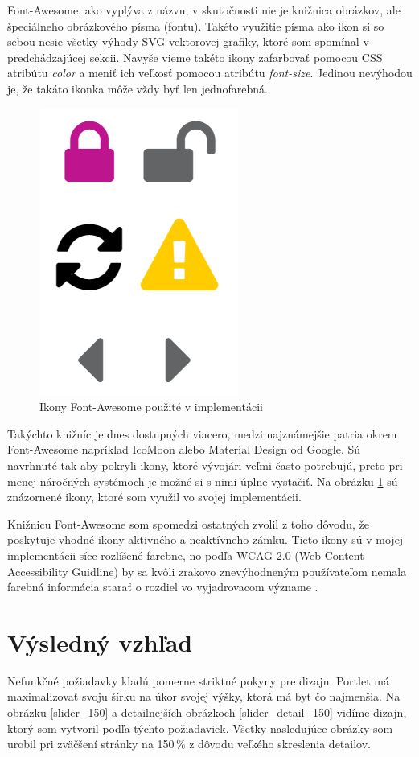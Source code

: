 \documentclass[
  digital, %
  twoside, %
  notable,   %
  nolof,   %
  nolot,   %
]{fithesis3}
\begin{document}
Font-Awesome, ako vyplýva z názvu, v skutočnosti nie je knižnica obrázkov, ale špeciálneho obrázkového písma (fontu). Takéto využitie písma ako ikon si so sebou nesie všetky výhody SVG vektorovej grafiky, ktoré som spomínal v predchádzajúcej sekcii. Navyše vieme takéto ikony zafarbovať pomocou CSS atribútu \textit{color} a meniť ich veľkosť pomocou atribútu \textit{font-size}. Jedinou nevýhodou je, že takáto ikonka môže vždy byť len jednofarebná.

\begin{figure}
	\center
	\includegraphics[width=.25\linewidth]{icons}
	\caption{Ikony Font-Awesome použité v implementácii}
	\label{icons}
\end{figure}

Takýchto knižníc je dnes dostupných viacero, medzi najznámejšie patria okrem Font-Awesome napríklad IcoMoon alebo Material Design od Google. Sú navrhnuté tak aby pokryli ikony, ktoré vývojári veľmi často potrebujú, preto pri menej náročných systémoch je možné si s nimi úplne vystačiť. Na obrázku \ref{icons} sú znázornené ikony, ktoré som využil vo svojej implementácii.

Knižnicu Font-Awesome som spomedzi ostatných zvolil z toho dôvodu, že poskytuje vhodné ikony aktivného a neaktívneho zámku. Tieto ikony sú v mojej implementácii síce rozlíšené farebne, no podľa WCAG 2.0 (Web Content Accessibility Guidline) by sa kvôli zrakovo znevýhodneným používateľom nemala farebná informácia starať o rozdiel vo vyjadrovacom význame \cite[sekcia~1.4]{caldwell2008web}.

\section{Výsledný vzhľad}
\label{design_created}
Nefunkčné požiadavky kladú pomerne striktné pokyny pre dizajn. Portlet má maximalizovať svoju šírku na úkor svojej výšky, ktorá má byť čo najmenšia. Na obrázku \ref{slider_150} a detailnejších obrázkoch \ref{slider_detail_150} vidíme dizajn, ktorý som vytvoril podľa týchto požiadaviek. Všetky nasledujúce obrázky som urobil pri zväčšení stránky na 150\,\% z dôvodu veľkého skreslenia detailov.
\end{document}
